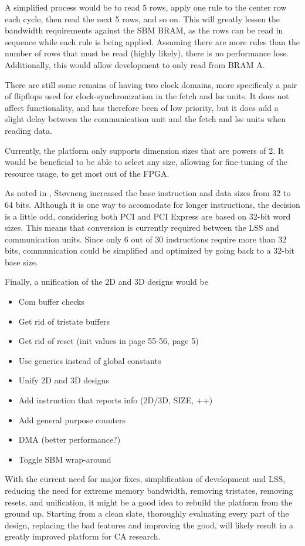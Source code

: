 A simplified process would be to read 5 rows, apply one rule to the center row each cycle, then read the next 5 rows, and so on.
This will greatly lessen the bandwidth requirements against the SBM BRAM, as the rows can be read in sequence while each rule is being applied.
Assuming there are more rules than the number of rows that must be read (highly likely), there is no performance loss.
Additionally, this would allow development to only read from BRAM A.

There are still some remains of having two clock domains, more specificaly a pair of flipflops used for clock-synchronization in the fetch and lss units.
It does not affect functionality, and has therefore been of low priority, but it does add a slight delay between the communication unit and the fetch and lss units when reading data.

Currently, the platform only supports dimension sizes that are powers of 2.
It would be beneficial to be able to select any size, allowing for fine-tuning of the resource usage, to get most out of the FPGA.

As noted in \cite{stovneng2014sblock}, Støvneng increased the base instruction and data sizes from 32 to 64 bits.
Although it is one way to accomodate for longer instructions, the decision is a little odd, considering both PCI and PCI Express are based on 32-bit word sizes.
This means that conversion is currently required between the LSS and communication units.
Since only 6 out of 30 instructions require more than 32 bits, communication could be simplified and optimized by going back to a 32-bit base size.

Finally, a unification of the 2D and 3D designs would be \TODO

\begin{itemize}
    \item Com buffer checks
    \item Get rid of tristate buffers \cite{koch2008buses}
    \item Get rid of reset (init values in \cite{ug687} page 55-56, \cite{wp272} page 5)
    \item Use generics instead of global constants
    \item Unify 2D and 3D designs
    \item Add instruction that reports info (2D/3D, SIZE, ++)
    \item Add general purpose counters
    \item DMA (better performance?)
    \item Toggle SBM wrap-around
\end{itemize}

With the current need for major fixes, simplification of development and LSS, reducing the need for extreme memory bandwidth, removing tristates, removing resets, and unification, it might be a good idea to rebuild the platform from the ground up.
Starting from a clean slate, thoroughly evaluating every part of the design, replacing the bad features and improving the good, will likely result in a greatly improved platform for CA research.

